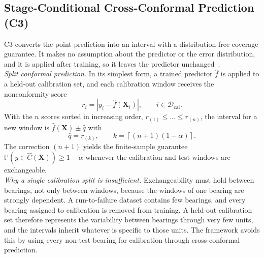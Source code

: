 \documentclass[review]{elsarticle}
\begin{document}
\subsection{Stage-Conditional Cross-Conformal Prediction (C3)}
\label{sec:c3_conformal}

C3 converts the point prediction into an interval with a
distribution-free coverage guarantee. It makes no assumption about the
predictor or the error distribution, and it is applied after training,
so it leaves the predictor unchanged~\cite{lei2018distribution,
angelopoulos2023gentle}.\\

\textit{Split conformal prediction.} In its simplest form, a trained
predictor $\hat{f}$ is applied to a held-out calibration set, and each
calibration window receives the nonconformity score
\begin{equation}
  r_i = \left| y_i - \hat{f}(\mathbf{X}_i) \right|,
  \qquad i \in \mathcal{D}_{\mathrm{cal}} .
  \label{eq:score}
\end{equation}
With the $n$ scores sorted in increasing order,
$r_{(1)} \leq \dots \leq r_{(n)}$, the interval for a new window is
$\hat{f}(\mathbf{X}) \pm \hat{q}$ with
\begin{equation}
  \hat{q} = r_{(k)}, \qquad
  k = \left\lceil (n+1)(1-\alpha) \right\rceil .
  \label{eq:quantile}
\end{equation}
The correction $(n+1)$ yields the finite-sample guarantee
$\mathbb{P}(y \in \hat{C}(\mathbf{X})) \geq 1 - \alpha$ whenever the
calibration and test windows are exchangeable.\\

\textit{Why a single calibration split is insufficient.} Exchangeability
must hold between bearings, not only between windows, because the
windows of one bearing are strongly dependent. A run-to-failure dataset
contains few bearings, and every bearing assigned to calibration is
removed from training. A held-out calibration set therefore represents
the variability between bearings through very few units, and the
intervals inherit whatever is specific to those units. The framework
avoids this by using every non-test bearing for calibration through
cross-conformal prediction.\\
\end{document}
